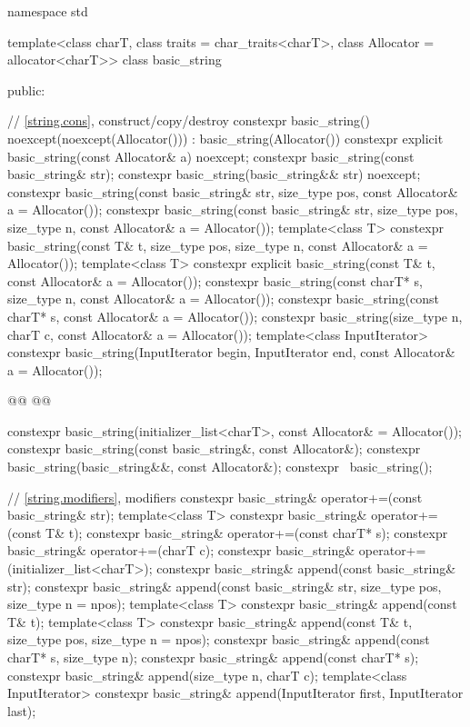 \documentclass{wg21}
\begin{document}
\begin{codeblock}
namespace std {
    template<class charT, class traits = char_traits<charT>, class Allocator = allocator<charT>>
    class basic_string {
        public:

        // \ref{string.cons}, construct/copy/destroy
        constexpr basic_string() noexcept(noexcept(Allocator())) : basic_string(Allocator()) { }
        constexpr explicit basic_string(const Allocator& a) noexcept;
        constexpr basic_string(const basic_string& str);
        constexpr basic_string(basic_string&& str) noexcept;
        constexpr basic_string(const basic_string& str, size_type pos,
        const Allocator& a = Allocator());
        constexpr basic_string(const basic_string& str, size_type pos, size_type n,
        const Allocator& a = Allocator());
        template<class T>
        constexpr basic_string(const T& t, size_type pos, size_type n,
        const Allocator& a = Allocator());
        template<class T>
        constexpr explicit basic_string(const T& t, const Allocator& a = Allocator());
        constexpr basic_string(const charT* s, size_type n, const Allocator& a = Allocator());
        constexpr basic_string(const charT* s, const Allocator& a = Allocator());
        constexpr basic_string(size_type n, charT c, const Allocator& a = Allocator());
        template<class InputIterator>
        constexpr basic_string(InputIterator begin, InputIterator end, const Allocator& a = Allocator());

        @@
        @@

        constexpr basic_string(initializer_list<charT>, const Allocator& = Allocator());
        constexpr basic_string(const basic_string&, const Allocator&);
        constexpr basic_string(basic_string&&, const Allocator&);
        constexpr ~basic_string();

        // \ref{string.modifiers}, modifiers
        constexpr basic_string& operator+=(const basic_string& str);
        template<class T>
        constexpr basic_string& operator+=(const T& t);
        constexpr basic_string& operator+=(const charT* s);
        constexpr basic_string& operator+=(charT c);
        constexpr basic_string& operator+=(initializer_list<charT>);
        constexpr basic_string& append(const basic_string& str);
        constexpr basic_string& append(const basic_string& str, size_type pos, size_type n = npos);
        template<class T>
        constexpr basic_string& append(const T& t);
        template<class T>
        constexpr basic_string& append(const T& t, size_type pos, size_type n = npos);
        constexpr basic_string& append(const charT* s, size_type n);
        constexpr basic_string& append(const charT* s);
        constexpr basic_string& append(size_type n, charT c);
        template<class InputIterator>
        constexpr basic_string& append(InputIterator first, InputIterator last);

}}
\end{codeblock}
\end{document}
